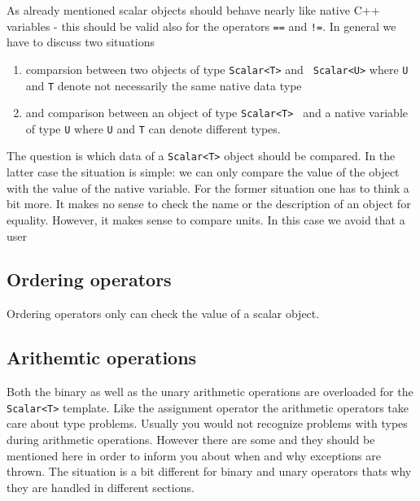 As already mentioned scalar objects should behave nearly like native C++
variables - this should be valid also for the operators {\tt ==} and {\tt !=}.
In general we have to discuss two situations
\begin{enumerate}
  \item comparsion between two objects of type {\tt Scalar<T>} and {\tt
  Scalar<U>} where {\tt U} and {\tt T} denote not necessarily the same 
  native data type
  \item and comparison between an object of type {\tt Scalar<T> } and a 
  native variable of type {\tt U} where {\tt U} and {\tt T} can denote
  different types.
\end{enumerate}
 The question is which data of a {\tt Scalar<T>} object should be compared.
In the latter case the situation is simple: we can only compare the value of the 
object with the value of the native variable. 
For the former situation one has to think a bit more. It makes no sense to
check the name or the description of an object for equality. 
However, it makes sense to compare units. In this case we avoid that 
a user    


\subsection{Ordering operators}

Ordering operators only can check the value of a scalar object.   


\subsection{Arithemtic operations}
Both the binary as well as the unary arithmetic operations are overloaded 
for the {\tt Scalar<T>} template. Like the assignment operator the arithmetic
operators take care about type problems. Usually you would not recognize
problems with types during arithmetic operations. However there are some 
and they should be mentioned here in order to inform you about when and why 
exceptions are thrown. The situation is a bit different for binary and unary 
operators thats why they are handled in different sections.

